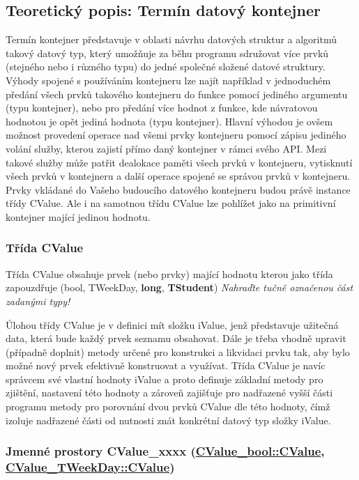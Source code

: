 \subsection*{Teoretický popis\+: Termín datový kontejner}

Termín kontejner představuje v oblasti návrhu datových struktur a algoritmů takový datový typ, který umožňuje za běhu programu sdružovat více prvků (stejného nebo i různého typu) do jedné společné složené datové struktury. Výhody spojené s používáním kontejneru lze najít například v jednoduchém předání všech prvků takového kontejneru do funkce pomocí jediného argumentu (typu kontejner), nebo pro předání více hodnot z funkce, kde návratovou hodnotou je opět jediná hodnota (typu kontejner). Hlavní výhodou je ovšem možnost provedení operace nad všemi prvky kontejneru pomocí zápisu jediného volání služby, kterou zajistí přímo daný kontejner v rámci svého A\+PI. Mezi takové služby může patřit dealokace paměti všech prvků v kontejneru, vytisknutí všech prvků v kontejneru a další operace spojené se správou prvků v kontejneru. Prvky vkládané do Vašeho budoucího datového kontejneru budou právě instance třídy {\ttfamily C\+Value}. Ale i na samotnou třídu {\ttfamily C\+Value} lze pohlížet jako na primitivní kontejner mající jedinou hodnotu.

\subsubsection*{Třída C\+Value}

Třída {\ttfamily C\+Value} obsahuje prvek (nebo prvky) mající hodnotu kterou jako třída zapouzdřuje ({\ttfamily bool}, {\ttfamily T\+Week\+Day}, {\bfseries long}, {\bfseries T\+Student}) {\itshape Nahraďte tučně označenou část zadanými typy!}

Úlohou třídy {\ttfamily C\+Value} je v definici mít složku {\ttfamily i\+Value}, jenž představuje užitečná data, která bude každý prvek seznamu obsahovat. Dále je třeba vhodně upravit (případně doplnit) metody určené pro konstrukci a likvidaci prvku tak, aby bylo možné nový prvek efektivně konstruovat a využívat. Třída {\ttfamily C\+Value} je navíc správcem své vlastní hodnoty {\ttfamily i\+Value} a proto definuje základní metody pro zjištění, nastavení této hodnoty a zároveň zajišťuje pro nadřazené vyšší části programu metody pro porovnání dvou prvků {\ttfamily C\+Value} dle této hodnoty, čímž izoluje nadřazené části od nutnosti znát konkrétní datový typ složky {\ttfamily i\+Value}.

\subsubsection*{Jmenné prostory C\+Value\+\_\+xxxx (\hyperlink{class_c_value__bool_1_1_c_value}{C\+Value\+\_\+bool\+::\+C\+Value}, \hyperlink{class_c_value___t_week_day_1_1_c_value}{C\+Value\+\_\+\+T\+Week\+Day\+::\+C\+Value})}

